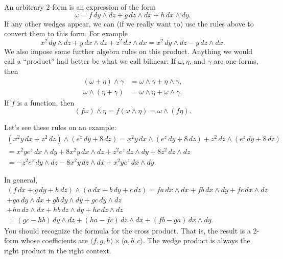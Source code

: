 \documentclass[12pt]{article}
\begin{document}
An arbitrary $2$-form is an expression of the form
\[
\omega = 
f\, dy \wedge dz + 
g\, dz \wedge dx +
h\, dx \wedge dy .
\]
If any other wedges appear, we can (if we really want to)
use the rules above to convert them to this
form.  For example
\[
x^2 \, dy \wedge dz + 
y \, dx \wedge dz +
z^2\, dx \wedge dx 
=
x^2 \, dy \wedge dz - y \, dz \wedge dx .
\]
We also impose some further algebra rules on this product.  Anything we would
call a ``product'' had better be
what we call bilinear:  If $\omega, \eta$, and $\gamma$ are one-forms, then
\begin{align*}
(\omega + \eta) \wedge \gamma
& =
\omega \wedge \gamma
+
\eta \wedge \gamma ,
\\
\omega \wedge (\eta + \gamma)
& =
\omega \wedge \eta
+
\omega \wedge \gamma .
\end{align*}
If $f$ is a function, then
\begin{equation*}
(f \omega) \wedge \eta =
f (\omega \wedge \eta) =
\omega \wedge ( f \eta) .
\end{equation*}

Let's see these rules on an example:
\begin{multline*}
( x^2 y \, dx + z^2 \, dz) \wedge (e^z \, dy + 8 \, dz)
=
x^2 y \, dx \wedge (e^z \, dy + 8 \, dz)
+
z^2 \, dz \wedge (e^z \, dy + 8 \, dz)
\\
=
x^2 y e^z \, dx \wedge dy
+
8 x^2 y \, dx \wedge dz
+
z^2 e^z \, dz \wedge dy
+
8 z^2 \, dz \wedge dz
\\
=
- z^2 e^z \, dy \wedge dz
-
8 x^2 y \, dz \wedge dx
+
x^2 y e^z \, dx \wedge dy .
\end{multline*}

In general,
\begin{multline*}
(f\, dx + g\, dy + h \, dz) \wedge
(a\, dx + b\, dy + c \, dz)
=
fa\, dx \wedge dx +
fb\, dx \wedge dy +
fc\, dx \wedge dz
\\
+
ga\, dy \wedge dx +
gb\, dy \wedge dy +
gc\, dy \wedge dz 
\\
+
ha\, dz \wedge dx +
hb\, dz \wedge dy +
hc\, dz \wedge dz
\\
=
(gc-hb)\, dy \wedge dz +
(ha-fc)\, dz \wedge dx +
(fb - ga) \, dx \wedge dy .
\end{multline*}
You should recognize the formula for the cross product.  That is,
the result is a 2-form whose coefficients are
$\langle f,g,h \rangle \times
\langle a,b,c \rangle$.
The wedge product
is always the right product in the right context.
\end{document}
